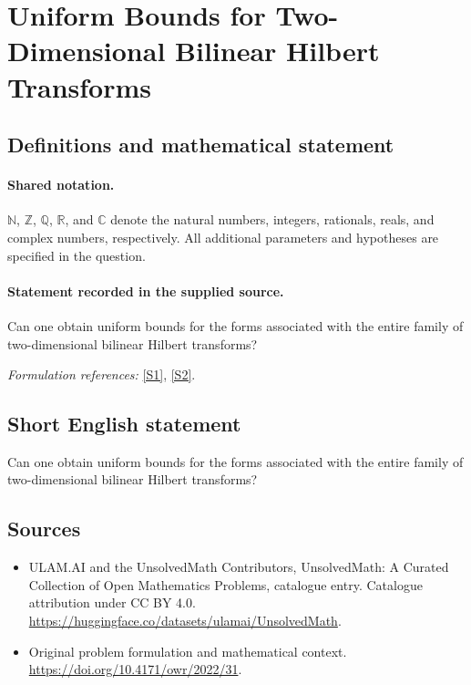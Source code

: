\documentclass[11pt]{article}
\newcommand{\sref}[2]{\hyperlink{source:#1:#2}{[S#2]}}
\begin{document}
\section{Uniform Bounds for Two-Dimensional Bilinear Hilbert Transforms}\label{statement}

\subsection{Definitions and mathematical statement}

\paragraph{Shared notation.}$\mathbb N$, $\mathbb Z$, $\mathbb Q$, $\mathbb R$, and $\mathbb C$ denote the natural numbers, integers, rationals, reals, and complex numbers, respectively. All additional parameters and hypotheses are specified in the question.


\paragraph{Statement recorded in the supplied source.}
Can one obtain uniform bounds for the forms associated with the entire family of two-dimensional bilinear Hilbert transforms?
\par\smallskip\textit{Formulation references:} \sref{statement}{1}, \sref{statement}{2}.
\subsection{Short English statement}
Can one obtain uniform bounds for the forms associated with the entire family of two-dimensional bilinear Hilbert transforms?
\subsection{Sources}
\begin{itemize}
\item[\hypertarget{source:statement:1}{S1}] ULAM.AI and the UnsolvedMath Contributors, UnsolvedMath: A Curated Collection of Open Mathematics Problems, catalogue entry. Catalogue attribution under CC BY 4.0.
\url{https://huggingface.co/datasets/ulamai/UnsolvedMath}.
\item[\hypertarget{source:statement:2}{S2}] Original problem formulation and mathematical context.
\url{https://doi.org/10.4171/owr/2022/31}.
\end{itemize}
\label{end:statement}
\end{document}
